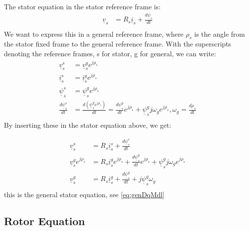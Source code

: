 \documentclass[]{book}
\begin{document}
The stator equation in the stator reference frame is:
\[
\begin{aligned}
\underline{v}_s & = R_s \underline{i}_s + \frac{d\underline{\psi}_s}{dt}  \\
\end{aligned}
\label{eq:statorVoltStat}
\]
We want to express this in a general reference frame, where \(\rho_s\) is the angle from the stator fixed frame to the general reference frame. With the superscripts denoting the reference frames, s for stator, g for general, we can write:
\[
\begin{aligned}
\underline{v}^s_s & = \underline{v}^g_s e^{j\rho_s} \\
\underline{i}^s_s & = \underline{i}^g_s e^{j\rho_s} \\
\underline{\psi}^s_s & = \underline{\psi}^g_s e^{j\rho_s} \\
\frac{d\underline{\psi}^s_s}{dt}  & = \frac{d (\underline{\psi}^g_s e^{j\rho_s} )}{dt}  = 
\frac{d\underline{\psi}^g_s}{dt}  e^{j\rho_s} + \underline{\psi}^g_s j \omega_g e^{j\rho_s},
\omega_g = \frac{d\rho_s}{dt} \\
\end{aligned}
\label{eq:statorVoltStat1}
\]
By inserting these in the stator equation above, we get:

\[
\begin{aligned}
\underline{v}^s_s & = R_s \underline{i}^s_s + \frac{d\underline{\psi}^s_s}{dt}  \\
\underline{v}^g_s e^{j\rho_s} & = R_s \underline{i}^g_s e^{j\rho_s} + \frac{d\underline{\psi}^g_s}{dt}  e^{j\rho_s} + \underline{\psi}^g_s j \omega_g e^{j\rho_s}  \\
\underline{v}^g_s  & = R_s \underline{i}^g_s  + \frac{d\underline{\psi}^g_s}{dt}   + j\underline{\psi}^g_s  \omega_g   \\
\end{aligned}
\label{eq:statorVoltStat2}
\]
this is the general stator equation, see \eqref{eq:genDqMdl}

\hypertarget{rotor-equation}{%
\subsection{Rotor Equation}\label{rotor-equation}}
\end{document}
